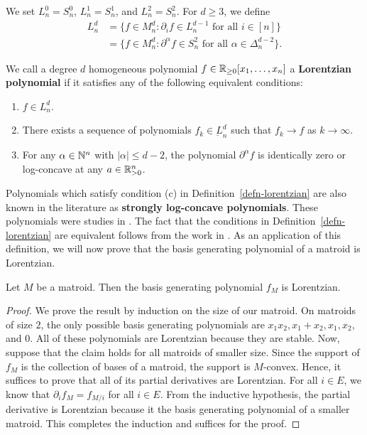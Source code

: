 \documentclass{puthesis-UG}
\begin{document}
\begin{defn} \label{def:lorentzian-m-convex-defn}
	We set $L_n^0 = S_n^0$, $L_n^1 = S_n^1$, and $L_n^2 = S_n^2$. For $d \geq 3$, we define 
	\begin{align*}
		L_n^d & = \{f \in M_n^d : \partial_i f \in L_n^{d-1} \text{ for all } i \in [n]\} \\
		& = \{f \in M_n^d : \partial^\alpha f \in S_n^2 \text{ for all } \alpha \in \Delta_n^{d-2}\}.
	\end{align*}
\end{defn}

\begin{defn} \label{defn-lorentzian}
	We call a degree $d$ homogeneous polynomial $f \in \mathbb{R}_{\geq 0}[x_1, \ldots, x_n]$ a \textbf{Lorentzian polynomial} if it satisfies any of the following equivalent conditions:
	\begin{enumerate}[label = (\alph*)]
		\item $f \in L_n^d$. 

		\item There exists a sequence of polynomials $f_k \in \underbar{L}_n^d$ such that $f_k \to f$ as $k \to \infty$.  

		\item For any $\alpha \in \mathbb{N}^n$ with $|\alpha| \leq d-2$, the polynomial $\partial^\alpha f$ is identically zero or log-concave at any $a \in \mathbb{R}_{>0}^n$. 
	\end{enumerate}
\end{defn}

Polynomials which satisfy condition (c) in Definition~\ref{defn-lorentzian} are also known in the literature as \textbf{strongly log-concave polynomials}. These polynomials were studies in \cite{anari2018logconcave}. The fact that the conditions in Definition~\ref{defn-lorentzian} are equivalent follows from the work in \cite{lorentzian-polynomials}. As an application of this definition, we will now prove that the basis generating polynomial of a matroid is Lorentzian.

\begin{thm} \label{basis-generating-polynomial-is-lorentzian-thm}
	Let $M$ be a matroid. Then the basis generating polynomial $f_M$ is Lorentzian. 
\end{thm}
\begin{proof}
	We prove the result by induction on the size of our matroid. On matroids of size $2$, the only possible basis generating polynomials are $x_1x_2, x_1 + x_2, x_1, x_2$, and $0$. All of these polynomials are Lorentzian because they are stable. Now, suppose that the claim holds for all matroids of smaller size. Since the support of $f_M$ is the collection of bases of a matroid, the support is $M$-convex. Hence, it suffices to prove that all of its partial derivatives are Lorentzian. For all $i \in E$, we know that $\partial_i f_M = f_{M / i}$ for all $i \in E$. From the inductive hypothesis, the partial derivative is Lorentzian because it the basis generating polynomial of a smaller matroid. This completes the induction and suffices for the proof.  
\end{proof}
\end{document}
